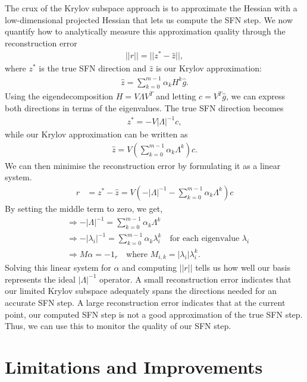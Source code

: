 The crux of the Krylov subspace approach is to approximate the Hessian with a low-dimensional projected Hessian that lets us compute the SFN step. We now quantify how to analytically measure this approximation quality through the reconstruction error
\begin{align}
    ||r|| = ||z^* - \hat{z}||,
\end{align}
where $z^*$ is the true SFN direction and $\hat{z}$ is our Krylov approximation:
\begin{align}
    \hat{z} = \sum_{k=0}^{m-1} \alpha_k H^k \hat{g}.
\end{align}
Using the eigendecomposition $H = V \Lambda V^T$ and letting $c = V^T \hat{g}$, we can express both directions in terms of the eigenvalues. The true SFN direction becomes
\begin{align}
    z^* = -V |\Lambda|^{-1} c,
\end{align}
while our Krylov approximation can be written as
\begin{align}
    \hat{z} = V \left(\sum_{k=0}^{m-1} \alpha_k \Lambda^k\right) c.
\end{align}
We can then minimise the reconstruction error by formulating it as a linear system.
\begin{align}
    r &= z^* - \hat{z} = V(-|\Lambda|^{-1} - \sum_{k=0}^{m-1} \alpha_k \Lambda^k)c
\end{align}
By setting the middle term to zero, we get,
\begin{align}
    &\Rightarrow -|\Lambda|^{-1} = \sum_{k=0}^{m-1} \alpha_k \Lambda^k \\
    &\Rightarrow -|\lambda_i|^{-1} = \sum_{k=0}^{m-1} \alpha_k \lambda_i^k \quad \text{for each eigenvalue } \lambda_i \\
    &\Rightarrow M\alpha = -1_r \quad \text{where } M_{i,k} = |\lambda_i| \lambda_i^k.
\end{align}
Solving this linear system for $\alpha$ and computing $||r||$ tells us how well our basis represents the ideal $|\Lambda|^{-1}$ operator. A small reconstruction error indicates that our limited Krylov subspace adequately spans the directions needed for an accurate SFN step. A large reconstruction error indicates that at the current point, our computed SFN step is not a good approximation of the true SFN step. Thus, we can use this to monitor the quality of our SFN step.

\section{Limitations and Improvements}
\label{sec:limitations}

